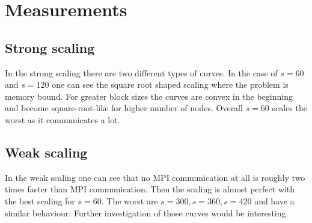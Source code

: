 \section{Measurements}
\subsection{Strong scaling}
In the strong scaling there are two different types of curves. In the case of $s=60$ and $s=120$ one can see the square root shaped scaling where the problem is memory bound. For greater block sizes the curves are convex in the beginning and become square-root-like for higher number of nodes. Overall $s=60$ scales the worst as it communicates a lot.
\subsection{Weak scaling}
In the weak scaling one can see that no MPI communication at all is roughly two times faster than MPI communication. Then the scaling is almost perfect with the best scaling for $s=60$. The worst are $s=300,s=360,s=420$ and have a similar behaviour. Further investigation of those curves would be interesting.
